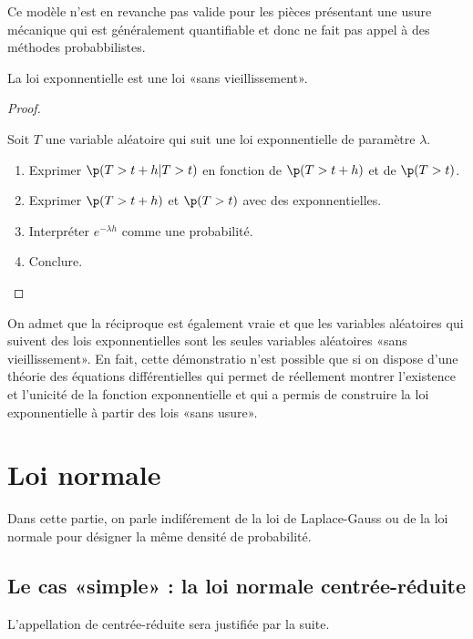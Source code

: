 \documentclass[11pt,a4paper,french]{article}
\begin{document}
Ce modèle n'est en revanche pas valide pour les pièces présentant une
usure mécanique qui est généralement quantifiable et donc ne fait pas
appel à des méthodes probabbilistes.

\begin{proposition}
  La loi exponnentielle est une loi «sans vieillissement».
\end{proposition}
\begin{proof}
  \begin{question}
    Soit $T$ une variable aléatoire qui suit une loi exponnentielle de
    paramètre $\lambda$.
    \begin{enumerate}
      \item Exprimer $\p(T > t+h | T > t)$ en fonction de $\p(T > t+h)$
        et de $\p(T > t)$.
      \item Exprimer $\p(T > t+h)$ et $\p(T > t)$ avec des
        exponnentielles.
      \item Interpréter $e^{-\lambda h}$ comme une probabilité.
      \item Conclure.
    \end{enumerate}
  \end{question}
\end{proof}

On admet que la réciproque est également vraie et que les variables
aléatoires qui suivent des lois exponnentielles sont les seules
variables aléatoires «sans vieillissement». En fait, cette démonstratio
n'est possible que si on dispose d'une théorie des équations
différentielles qui permet de réellement montrer l'existence et
l'unicité de la fonction exponnentielle et qui a permis de construire la
loi exponnentielle à partir des lois «sans usure».

\pagebreak

\section{Loi normale}

Dans cette partie, on parle indiférement de la loi de Laplace-Gauss ou
de la loi normale pour désigner la même densité de probabilité.

\subsection{Le cas «simple» : la loi normale centrée-réduite}

L'appellation de centrée-réduite sera justifiée par la suite.
\end{document}
